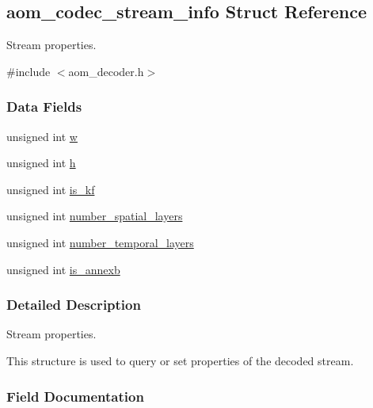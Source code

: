 \hypertarget{structaom__codec__stream__info}{}\subsection{aom\+\_\+codec\+\_\+stream\+\_\+info Struct Reference}
\label{structaom__codec__stream__info}


Stream properties.  




{\ttfamily \#include $<$aom\+\_\+decoder.\+h$>$}

\subsubsection*{Data Fields}
\begin{DoxyCompactItemize}
\item 
unsigned int \hyperlink{structaom__codec__stream__info_add84a2752fefd706f893fbc41ba6b9f2}{w}
\item 
unsigned int \hyperlink{structaom__codec__stream__info_a2f1c33e3b980b274176545340b474e34}{h}
\item 
unsigned int \hyperlink{structaom__codec__stream__info_a0264e63c333ff05b2afd6df478ed807c}{is\+\_\+kf}
\item 
unsigned int \hyperlink{structaom__codec__stream__info_af7487a0e56b6919f94a7e426abd44eac}{number\+\_\+spatial\+\_\+layers}
\item 
unsigned int \hyperlink{structaom__codec__stream__info_a8845a384d9d0b3d8670b8ad98b720c0e}{number\+\_\+temporal\+\_\+layers}
\item 
unsigned int \hyperlink{structaom__codec__stream__info_a1572ce7a1105c1db0a9dd43acb77b6c4}{is\+\_\+annexb}
\end{DoxyCompactItemize}


\subsubsection{Detailed Description}
Stream properties. 

This structure is used to query or set properties of the decoded stream. 

\subsubsection{Field Documentation}

